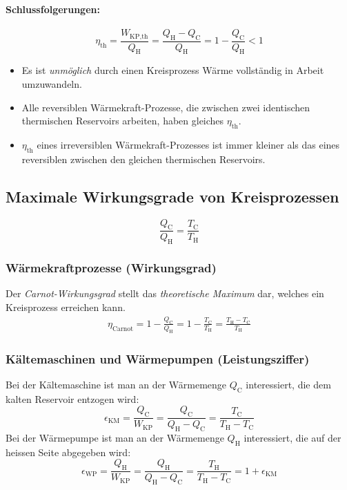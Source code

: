 		\paragraph{Schlussfolgerungen:} %
			\[
				\eta_\text{th} = \frac{W_\text{KP,th}}{Q_\text{H}} = \frac{Q_\text{H} - Q_\text{C}}{Q_\text{H}} = 1 - \frac{Q_\text{C}}{Q_\text{H}} < 1
			\]
			\begin{itemize}
				\item Es ist \emph{unmöglich} durch einen Kreisprozess Wärme vollständig in Arbeit umzuwandeln.
				\item Alle reversiblen Wärmekraft-Prozesse, die zwischen zwei identischen thermischen Reservoirs arbeiten, haben gleiches $\eta_\text{th}$.
				\item $\eta_\text{th}$ eines irreversiblen Wärmekraft-Prozesses ist immer kleiner als das eines reversiblen zwischen den gleichen thermischen Reservoirs.
			\end{itemize}
	\subsection{Maximale Wirkungsgrade von Kreisprozessen} %
		\[
			\frac{Q_\text{C}}{Q_\text{H}} = \frac{T_\text{C}}{T_\text{H}}
		\]
		\subsubsection{Wärmekraftprozesse (Wirkungsgrad)} %
			Der \emph{Carnot-Wirkungsgrad} stellt das \emph{theoretische Maximum} dar, welches ein Kreisprozess erreichen kann.
			\begin{gather*}
				\eta_{\text{Carnot}} = 1 - \frac{Q_\text{C}}{Q_\text{H}} = 1 - \frac{T_\text{C}}{T_\text{H}} = \frac{T_\text{H} - T_\text{C}}{T_\text{H}}
			\end{gather*}
		\subsubsection{Kältemaschinen und Wärmepumpen (Leistungsziffer)} %
			Bei der Kältemaschine ist man an der Wärmemenge $Q_\text{C}$ interessiert, die dem kalten Reservoir entzogen wird:
			\[
				\epsilon_{\text{KM}} = \frac{Q_\text{C}}{W_{\text{KP}}} = \frac{Q_\text{C}}{Q_\text{H} - Q_\text{C}} = \frac{T_\text{C}}{T_\text{H} - T_\text{C}}
			\]
			Bei der Wärmepumpe ist man an der Wärmemenge $Q_\text{H}$ interessiert, die auf der heissen Seite abgegeben wird:
			\[
				\epsilon_{\text{WP}} = \frac{Q_\text{H}}{W_{\text{KP}}} = \frac{Q_\text{H}}{Q_\text{H} - Q_\text{C}} = \frac{T_\text{H}}{T_\text{H} - T_\text{C}} = 1 + \epsilon_{\text{KM}}
			\]
	
